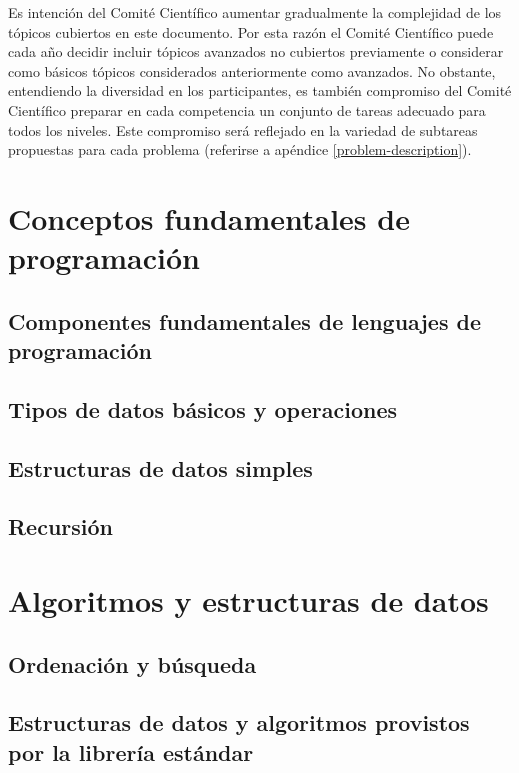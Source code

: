 \documentclass{article}
\begin{document}
Es intención del Comité Científico aumentar gradualmente la complejidad de los
tópicos cubiertos en este documento.
Por esta razón el Comité Científico puede cada año decidir incluir tópicos
avanzados no cubiertos previamente o considerar como básicos tópicos
considerados anteriormente como avanzados.
No obstante, entendiendo la diversidad en los participantes, es también
compromiso del Comité Científico preparar en cada competencia un conjunto de
tareas adecuado para todos los niveles.
Este compromiso será reflejado en la variedad de subtareas propuestas para cada
problema (referirse a apéndice \ref{problem-description}).

\section{Conceptos fundamentales de programación}

\subsection{Componentes fundamentales de lenguajes de programación}


\subsection{Tipos de datos básicos y operaciones}


\subsection{Estructuras de datos simples}


\subsection{Recursión}


\section{Algoritmos y estructuras de datos}
\subsection{Ordenación y búsqueda}


\subsection{Estructuras de datos y algoritmos provistos por la librería estándar}

\end{document}
